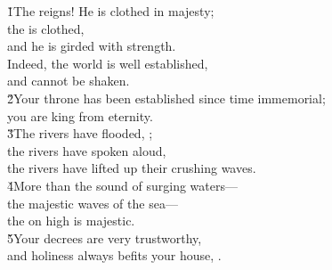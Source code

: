 
\begin{poetry}
\poeml \v{1}The  reigns! He is clothed in majesty; \\
\poemll    the  is clothed, \\
\poemlll       and he is girded with strength. \\
\poeml Indeed, the world is well established, \\
\poemll    and cannot be shaken. \\
\poeml \v{2}Your throne has been established since time immemorial; \\
\poemll    you are king from eternity. \\
\poeml \v{3}The rivers have flooded, ; \\
\poemll    the rivers have spoken aloud, \\
\poemlll       the rivers have lifted up their crushing waves. \\
\poeml \v{4}More than the sound of surging waters--- \\
\poemll    the majestic waves of the sea--- \\
\poemlll       the  on high is majestic. \\
\poeml \v{5}Your decrees are very trustworthy, \\
\poemll    and holiness always befits your house, .
\end{poetry}


